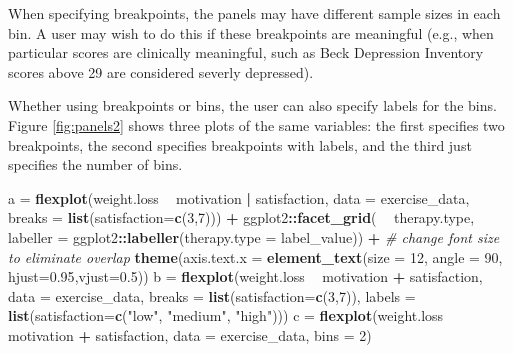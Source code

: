 \documentclass[
  doc]{apa6}
\newenvironment{Shaded}{\begin{snugshade}}{\end{snugshade}}
\newcommand{\CommentTok}[1]{\textcolor[rgb]{0.56,0.35,0.01}{\textit{#1}}}
\newcommand{\DataTypeTok}[1]{\textcolor[rgb]{0.13,0.29,0.53}{#1}}
\newcommand{\DecValTok}[1]{\textcolor[rgb]{0.00,0.00,0.81}{#1}}
\newcommand{\FloatTok}[1]{\textcolor[rgb]{0.00,0.00,0.81}{#1}}
\newcommand{\KeywordTok}[1]{\textcolor[rgb]{0.13,0.29,0.53}{\textbf{#1}}}
\newcommand{\NormalTok}[1]{#1}
\newcommand{\OperatorTok}[1]{\textcolor[rgb]{0.81,0.36,0.00}{\textbf{#1}}}
\newcommand{\StringTok}[1]{\textcolor[rgb]{0.31,0.60,0.02}{#1}}
\begin{document}
When specifying breakpoints, the panels may have different sample sizes in each bin. A user may wish to do this if these breakpoints are meaningful (e.g., when particular scores are clinically meaningful, such as Beck Depression Inventory scores above 29 are considered severly depressed).

Whether using breakpoints or bins, the user can also specify labels for the bins. Figure \ref{fig:panels2} shows three plots of the same variables: the first specifies two breakpoints, the second specifies breakpoints with labels, and the third just specifies the number of bins.

\begin{Shaded}
\begin{Highlighting}[]
\NormalTok{a =}\StringTok{ }\KeywordTok{flexplot}\NormalTok{(weight.loss }\OperatorTok{~}\StringTok{ }\NormalTok{motivation }\OperatorTok{|}\StringTok{ }\NormalTok{satisfaction, }
             \DataTypeTok{data =}\NormalTok{ exercise_data, }
             \DataTypeTok{breaks =} \KeywordTok{list}\NormalTok{(}\DataTypeTok{satisfaction=}\KeywordTok{c}\NormalTok{(}\DecValTok{3}\NormalTok{,}\DecValTok{7}\NormalTok{))) }\OperatorTok{+}
\StringTok{  }\NormalTok{ggplot2}\OperatorTok{::}\KeywordTok{facet_grid}\NormalTok{( }\OperatorTok{~}\StringTok{ }\NormalTok{therapy.type, }
              \DataTypeTok{labeller =}\NormalTok{ ggplot2}\OperatorTok{::}\KeywordTok{labeller}\NormalTok{(}\DataTypeTok{therapy.type =}\NormalTok{ label_value)) }\OperatorTok{+}
\StringTok{  }\CommentTok{# change font size to eliminate overlap}
\StringTok{    }\KeywordTok{theme}\NormalTok{(}\DataTypeTok{axis.text.x =} 
            \KeywordTok{element_text}\NormalTok{(}\DataTypeTok{size =} \DecValTok{12}\NormalTok{, }\DataTypeTok{angle =} \DecValTok{90}\NormalTok{, }\DataTypeTok{hjust=}\FloatTok{0.95}\NormalTok{,}\DataTypeTok{vjust=}\FloatTok{0.5}\NormalTok{))}
\NormalTok{b =}\StringTok{ }\KeywordTok{flexplot}\NormalTok{(weight.loss }\OperatorTok{~}\StringTok{ }\NormalTok{motivation }\OperatorTok{+}\StringTok{ }\NormalTok{satisfaction, }
             \DataTypeTok{data =}\NormalTok{ exercise_data, }
             \DataTypeTok{breaks =} \KeywordTok{list}\NormalTok{(}\DataTypeTok{satisfaction=}\KeywordTok{c}\NormalTok{(}\DecValTok{3}\NormalTok{,}\DecValTok{7}\NormalTok{)), }
             \DataTypeTok{labels =} \KeywordTok{list}\NormalTok{(}\DataTypeTok{satisfaction=}\KeywordTok{c}\NormalTok{(}\StringTok{"low"}\NormalTok{, }\StringTok{"medium"}\NormalTok{, }\StringTok{"high"}\NormalTok{)))}
\NormalTok{c =}\StringTok{ }\KeywordTok{flexplot}\NormalTok{(weight.loss }\OperatorTok{~}\StringTok{ }\NormalTok{motivation }\OperatorTok{+}\StringTok{ }\NormalTok{satisfaction, }
             \DataTypeTok{data =}\NormalTok{ exercise_data, }
             \DataTypeTok{bins =} \DecValTok{2}\NormalTok{) }
\end{Highlighting}
\end{Shaded}
\end{document}
